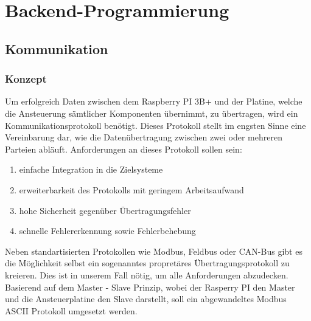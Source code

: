 \section{Backend-Programmierung}\label{sec:backend-programmierung}
\subsection{Kommunikation}
\subsubsection{Konzept}
Um erfolgreich Daten zwischen dem Raspberry PI 3B+ und der Platine, welche die Ansteuerung sämtlicher Komponenten übernimmt, zu übertragen, wird ein Kommunikationsprotokoll benötigt.
Dieses Protokoll stellt im engsten Sinne eine Vereinbarung dar, wie die Datenübertragung zwischen zwei oder mehreren Parteien abläuft.
Anforderungen an dieses Protokoll sollen sein:
\begin{enumerate}
    \item einfache Integration in die Zielsysteme
    \item erweiterbarkeit des Protokolls mit geringem Arbeitsaufwand
    \item hohe Sicherheit gegenüber Übertragungsfehler
    \item schnelle Fehlererkennung sowie Fehlerbehebung
\end{enumerate}
Neben standartisierten Protokollen wie Modbus, Feldbus oder CAN-Bus gibt es die Möglichkeit selbst ein sogenanntes propretäres Übertragungsprotokoll zu kreieren.
Dies ist in unserem Fall nötig, um alle Anforderungen abzudecken.
Basierend auf dem Master - Slave Prinzip, wobei der Rasperry PI den Master und die Ansteuerplatine den Slave darstellt, soll ein abgewandeltes Modbus ASCII Protokoll umgesetzt werden.

